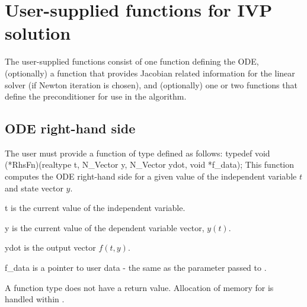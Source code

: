 \section{User-supplied functions for IVP solution}\label{ss:user_fct_sim}

The user-supplied functions consist of one function defining the ODE, 
(optionally) a function that provides Jacobian related information for the linear 
solver (if Newton iteration is chosen), and (optionally) one or two functions 
that define the preconditioner for use in the {\spgmr} algorithm. 
\subsection{ODE right-hand side} 
\label{ss:rhsFn}
The user must provide a function of type  defined as follows:
{
  typedef void (*RhsFn)(realtype t, N\_Vector y, N\_Vector ydot, void *f\_data);
}
{
  This function computes the ODE right-hand side for a given value
  of the independent variable $t$ and state vector $y$.
}
{
  \begin{args}[f\_data]
  \item[t]
    is the current value of the independent variable.
  \item[y]
    is the current value of the dependent variable vector, $y(t)$.
  \item[ydot]
    is the output vector $f(t,y)$.
  \item[f\_data]
    is a pointer to user data - the same as the       
    parameter passed to .   
  \end{args}
}
{
  A  function type does not have a return value.                        
}
{
Allocation of memory for  is handled within {\cvode}.
}
